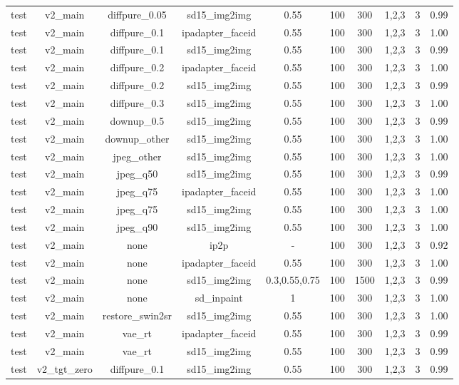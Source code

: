 \begin{table}[t]
{\begin{tabular}{lccccccccc}
test & v2\_main & diffpure\_0.05 & sd15\_img2img & 0.55 & 100 & 300 & 1,2,3 & 3 & 0.99 \\
test & v2\_main & diffpure\_0.1 & ipadapter\_faceid & 0.55 & 100 & 300 & 1,2,3 & 3 & 1.00 \\
test & v2\_main & diffpure\_0.1 & sd15\_img2img & 0.55 & 100 & 300 & 1,2,3 & 3 & 0.99 \\
test & v2\_main & diffpure\_0.2 & ipadapter\_faceid & 0.55 & 100 & 300 & 1,2,3 & 3 & 1.00 \\
test & v2\_main & diffpure\_0.2 & sd15\_img2img & 0.55 & 100 & 300 & 1,2,3 & 3 & 0.99 \\
test & v2\_main & diffpure\_0.3 & sd15\_img2img & 0.55 & 100 & 300 & 1,2,3 & 3 & 1.00 \\
test & v2\_main & downup\_0.5 & sd15\_img2img & 0.55 & 100 & 300 & 1,2,3 & 3 & 0.99 \\
test & v2\_main & downup\_other & sd15\_img2img & 0.55 & 100 & 300 & 1,2,3 & 3 & 1.00 \\
test & v2\_main & jpeg\_other & sd15\_img2img & 0.55 & 100 & 300 & 1,2,3 & 3 & 1.00 \\
test & v2\_main & jpeg\_q50 & sd15\_img2img & 0.55 & 100 & 300 & 1,2,3 & 3 & 0.99 \\
test & v2\_main & jpeg\_q75 & ipadapter\_faceid & 0.55 & 100 & 300 & 1,2,3 & 3 & 1.00 \\
test & v2\_main & jpeg\_q75 & sd15\_img2img & 0.55 & 100 & 300 & 1,2,3 & 3 & 1.00 \\
test & v2\_main & jpeg\_q90 & sd15\_img2img & 0.55 & 100 & 300 & 1,2,3 & 3 & 1.00 \\
test & v2\_main & none & ip2p & - & 100 & 300 & 1,2,3 & 3 & 0.92 \\
test & v2\_main & none & ipadapter\_faceid & 0.55 & 100 & 300 & 1,2,3 & 3 & 1.00 \\
test & v2\_main & none & sd15\_img2img & 0.3,0.55,0.75 & 100 & 1500 & 1,2,3 & 3 & 0.99 \\
test & v2\_main & none & sd\_inpaint & 1 & 100 & 300 & 1,2,3 & 3 & 1.00 \\
test & v2\_main & restore\_swin2sr & sd15\_img2img & 0.55 & 100 & 300 & 1,2,3 & 3 & 1.00 \\
test & v2\_main & vae\_rt & ipadapter\_faceid & 0.55 & 100 & 300 & 1,2,3 & 3 & 0.99 \\
test & v2\_main & vae\_rt & sd15\_img2img & 0.55 & 100 & 300 & 1,2,3 & 3 & 0.99 \\
test & v2\_tgt\_zero & diffpure\_0.1 & sd15\_img2img & 0.55 & 100 & 300 & 1,2,3 & 3 & 0.99 \\

\end{tabular}}
\end{table}
